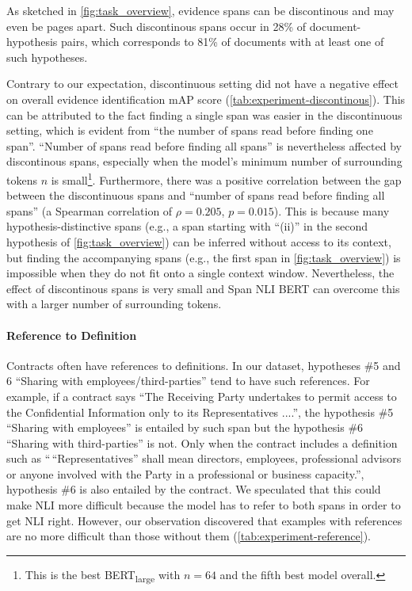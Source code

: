 As sketched in \cref{fig:task_overview}, evidence spans can be discontinous and may even be pages apart.
Such discontinous spans occur in 28\% of document-hypothesis pairs, which corresponds to 81\% of documents with at least one of such hypotheses.

Contrary to our expectation, discontinuous setting did not have a negative effect on overall evidence identification mAP score (\cref{tab:experiment-discontinous}).
This can be attributed to the fact finding a single span was easier in the discontinuous setting, which is evident from ``the number of spans read before finding one span''.
``Number of spans read before finding all spans'' is nevertheless affected by discontinous spans, especially when the model's minimum number of surrounding tokens $n$ is small\footnote{This is the best BERT\textsubscript{large} with $n=64$ and the fifth best model overall.}.
Furthermore, there was a positive correlation between the gap between the discontinuous spans and ``number of spans read before finding all spans'' (a Spearman correlation of $\rho=0.205$, $p=0.015$).
This is because many hypothesis-distinctive spans (e.g., a span starting with ``(ii)'' in the second hypothesis of \cref{fig:task_overview}) can be inferred without access to its context, but finding the accompanying spans (e.g., the first span in \cref{fig:task_overview}) is impossible when they do not fit onto a single context window.
Nevertheless, the effect of discontinous spans is very small and Span NLI BERT can overcome this with a larger number of surrounding tokens.

\paragraph{Reference to Definition}



Contracts often have references to definitions.
In our dataset, hypotheses \#5 and 6 ``Sharing with employees/third-parties'' tend to have such references.
For example, if a contract says ``The Receiving Party undertakes to permit access to the Confidential Information only to its Representatives ....'', the hypothesis \#5 ``Sharing with employees'' is entailed by such span but the hypothesis \#6 ``Sharing with third-parties'' is not.
Only when the contract includes a definition such as ``\,``Representatives'' shall mean directors, employees, professional advisors or anyone involved with the Party in a professional or business capacity.'', hypothesis \#6 is also entailed by the contract.
We speculated that this could make NLI more difficult because the model has to refer to both spans in order to get NLI right.
However, our observation discovered that examples with references are no more difficult than those without them (\cref{tab:experiment-reference}).
